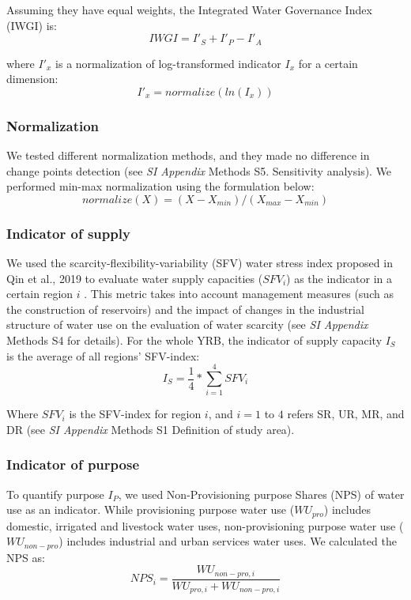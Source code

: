 	Assuming they have equal weights, the Integrated Water Governance Index (IWGI) is:
	\begin{equation}
		IWGI = I'_S + I'_P - I'_A
	\end{equation}

	where $I'_x$ is a normalization of log-transformed indicator $I_x$ for a certain dimension:
	\begin{equation}
		I'_x = normalize(ln(I_x))
	\end{equation}

	\subsubsection*{Normalization}
	We tested different normalization methods, and they made no difference in change points detection (see \textit{SI Appendix} Methods S5. Sensitivity analysis). We performed min-max normalization using the formulation below:
	\begin{equation}
		normalize(X) = (X - X_{min}) / (X_{max} - X_{min})
	\end{equation}

	\subsubsection*{Indicator of supply}
	We used the scarcity-flexibility-variability (SFV) water stress index proposed in Qin et al., 2019 to evaluate water supply capacities ($SFV_i$) as the indicator in a certain region $i$ \cite{qinFlexibilityintensityglobal2019}. This metric takes into account management measures (such as the construction of reservoirs) and the impact of changes in the industrial structure of water use on the evaluation of water scarcity (see \textit{SI Appendix} Methods S4 for details). For the whole YRB, the indicator of supply capacity $I_S$ is the average of all regions' SFV-index:
	\begin{equation}
		I_S = \frac{1}{4} * \sum_{i=1}^4 SFV_{i}
	\end{equation}

	Where $SFV_i$ is the SFV-index for region $i$, and $i=1$ to $4$ refers SR, UR, MR, and DR (see \textit{SI Appendix} Methods S1 Definition of study area).

	\subsubsection*{Indicator of purpose}
	To quantify purpose $I_P$, we used Non-Provisioning purpose Shares (NPS) of water use as an indicator. While provisioning purpose water use ($WU_{pro}$) includes domestic, irrigated and livestock water uses, non-provisioning purpose water use ($WU_{non-pro}$) includes industrial and urban services water uses. We calculated the NPS as:
	\begin{equation}
		NPS_{i} = \frac{WU_{non-pro, i}}{WU_{pro, i} + WU_{non-pro, i}}
	\end{equation}

